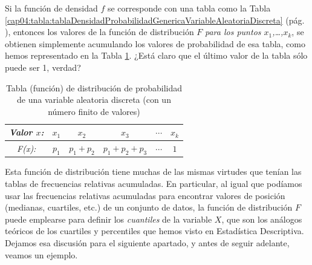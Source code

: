 Si la función de densidad $f$ se corresponde con una tabla como la Tabla \ref{cap04:tabla:tablaDensidadProbabilidadGenericaVariableAleatoriaDiscreta} (pág.
\pageref{cap04:tabla:tablaDensidadProbabilidadGenericaVariableAleatoriaDiscreta}), entonces los valores de la función de distribución $F$ {\em para los puntos $x_1$,\ldots,$x_k$}, se obtienen simplemente acumulando los valores de probabilidad de esa tabla, como hemos representado en la Tabla \ref{cap04:tabla:tablaDistribucionProbabilidadGenericaVariableAleatoriaDiscreta}.
¿Está claro que el último valor de la tabla sólo puede ser 1, verdad?

    \begin{table}[ht]
    \begin{center}
    \begin{tabular}[t]{|c|c|c|c|c|c|}
    \hline
    \rule{0cm}{0.5cm}{\em Valor $x$:}&$x_1$&$x_2$&$x_3$&$\cdots$&$x_k$\\
    \hline
    \rule{0cm}{0.7cm}{\em F(x):}&$p_1$&$p_1+p_2$&$p_1+p_2+p_3$&$\cdots$&$1$\\
    \hline
    \end{tabular}
    \end{center}
    \caption{Tabla (función) de distribución de probabilidad de una variable aleatoria discreta (con un número finito de valores)}\label{cap04:tabla:tablaDistribucionProbabilidadGenericaVariableAleatoriaDiscreta}
    \end{table}
Esta función de distribución tiene muchas de las mismas virtudes que tenían las tablas de frecuencias relativas acumuladas. En particular, al igual que podíamos usar las frecuencias relativas acumuladas para encontrar valores de posición (medianas, cuartiles, etc.) de un conjunto de datos, la función de distribución $F$ puede emplearse para definir los {\em cuantiles} de la variable $X$, que son los análogos teóricos de los cuartiles y percentiles que hemos visto en Estadística Descriptiva. Dejamos esa discusión para el siguiente apartado, y antes de seguir adelante, veamos un ejemplo.
